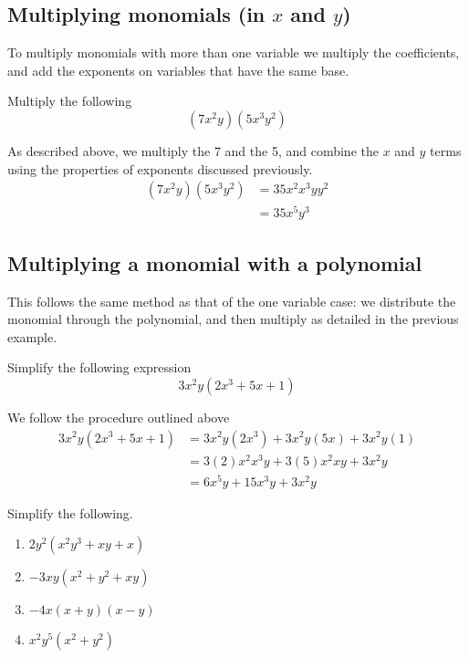 \subsection{Multiplying monomials (in $x$ and $y$)}
To multiply monomials with more than one variable we multiply the coefficients, and add the exponents on variables that have the same base.

\begin{myexample}
Multiply the following
\[
	(7x^2y)(5x^3y^2)
\]
\end{myexample}
\begin{myProof}
	As described above, we multiply the 7 and the 5, and combine the $x$ and $y$ terms using the properties
	of exponents discussed previously.
	\begin{align*}
		(7x^2y)(5x^3y^2) & =		35x^2x^3yy^2 \\
		                 & =		35x^5y^3     
	\end{align*} 
\end{myProof} 

\subsection{Multiplying a \gls{monomial} with a polynomial}
This follows the same method as that of the one variable case: we distribute the monomial through the polynomial, 
and then multiply as detailed in the previous example.

\begin{myexample}
Simplify the following expression
\[
	3x^2y(2x^3+5x+1)
\]
\end{myexample}
\begin{myProof}
	We follow the procedure outlined above
	\begin{align*}
		3x^2y(2x^3+5x+1) & =		3x^2y(2x^3)+3x^2y(5x)+3x^2y(1) \\
		                 & =		3(2)x^2x^3y+3(5)x^2xy+3x^2y    \\
		                 & =		6x^5y+15x^3y+3x^2y             
	\end{align*} 
\end{myProof}

\begin{myexample}
Simplify the following.
\drillandskill
\end{myexample}

\begin{enumerate}
	\item $2y^2(x^2y^3+xy+x)$
	\item $-3xy(x^2+y^2+xy)$
	\item $-4x(x+y)(x-y)$
	\item $x^2y^5(x^2+y^2)$
\end{enumerate}


